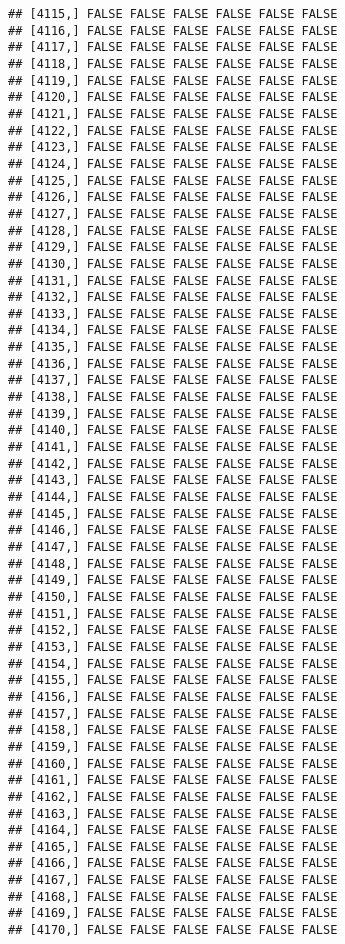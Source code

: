 \documentclass[
]{article}
\begin{document}
\begin{verbatim}
## [4115,] FALSE FALSE FALSE FALSE FALSE FALSE
## [4116,] FALSE FALSE FALSE FALSE FALSE FALSE
## [4117,] FALSE FALSE FALSE FALSE FALSE FALSE
## [4118,] FALSE FALSE FALSE FALSE FALSE FALSE
## [4119,] FALSE FALSE FALSE FALSE FALSE FALSE
## [4120,] FALSE FALSE FALSE FALSE FALSE FALSE
## [4121,] FALSE FALSE FALSE FALSE FALSE FALSE
## [4122,] FALSE FALSE FALSE FALSE FALSE FALSE
## [4123,] FALSE FALSE FALSE FALSE FALSE FALSE
## [4124,] FALSE FALSE FALSE FALSE FALSE FALSE
## [4125,] FALSE FALSE FALSE FALSE FALSE FALSE
## [4126,] FALSE FALSE FALSE FALSE FALSE FALSE
## [4127,] FALSE FALSE FALSE FALSE FALSE FALSE
## [4128,] FALSE FALSE FALSE FALSE FALSE FALSE
## [4129,] FALSE FALSE FALSE FALSE FALSE FALSE
## [4130,] FALSE FALSE FALSE FALSE FALSE FALSE
## [4131,] FALSE FALSE FALSE FALSE FALSE FALSE
## [4132,] FALSE FALSE FALSE FALSE FALSE FALSE
## [4133,] FALSE FALSE FALSE FALSE FALSE FALSE
## [4134,] FALSE FALSE FALSE FALSE FALSE FALSE
## [4135,] FALSE FALSE FALSE FALSE FALSE FALSE
## [4136,] FALSE FALSE FALSE FALSE FALSE FALSE
## [4137,] FALSE FALSE FALSE FALSE FALSE FALSE
## [4138,] FALSE FALSE FALSE FALSE FALSE FALSE
## [4139,] FALSE FALSE FALSE FALSE FALSE FALSE
## [4140,] FALSE FALSE FALSE FALSE FALSE FALSE
## [4141,] FALSE FALSE FALSE FALSE FALSE FALSE
## [4142,] FALSE FALSE FALSE FALSE FALSE FALSE
## [4143,] FALSE FALSE FALSE FALSE FALSE FALSE
## [4144,] FALSE FALSE FALSE FALSE FALSE FALSE
## [4145,] FALSE FALSE FALSE FALSE FALSE FALSE
## [4146,] FALSE FALSE FALSE FALSE FALSE FALSE
## [4147,] FALSE FALSE FALSE FALSE FALSE FALSE
## [4148,] FALSE FALSE FALSE FALSE FALSE FALSE
## [4149,] FALSE FALSE FALSE FALSE FALSE FALSE
## [4150,] FALSE FALSE FALSE FALSE FALSE FALSE
## [4151,] FALSE FALSE FALSE FALSE FALSE FALSE
## [4152,] FALSE FALSE FALSE FALSE FALSE FALSE
## [4153,] FALSE FALSE FALSE FALSE FALSE FALSE
## [4154,] FALSE FALSE FALSE FALSE FALSE FALSE
## [4155,] FALSE FALSE FALSE FALSE FALSE FALSE
## [4156,] FALSE FALSE FALSE FALSE FALSE FALSE
## [4157,] FALSE FALSE FALSE FALSE FALSE FALSE
## [4158,] FALSE FALSE FALSE FALSE FALSE FALSE
## [4159,] FALSE FALSE FALSE FALSE FALSE FALSE
## [4160,] FALSE FALSE FALSE FALSE FALSE FALSE
## [4161,] FALSE FALSE FALSE FALSE FALSE FALSE
## [4162,] FALSE FALSE FALSE FALSE FALSE FALSE
## [4163,] FALSE FALSE FALSE FALSE FALSE FALSE
## [4164,] FALSE FALSE FALSE FALSE FALSE FALSE
## [4165,] FALSE FALSE FALSE FALSE FALSE FALSE
## [4166,] FALSE FALSE FALSE FALSE FALSE FALSE
## [4167,] FALSE FALSE FALSE FALSE FALSE FALSE
## [4168,] FALSE FALSE FALSE FALSE FALSE FALSE
## [4169,] FALSE FALSE FALSE FALSE FALSE FALSE
## [4170,] FALSE FALSE FALSE FALSE FALSE FALSE

\end{verbatim}
\end{document}
